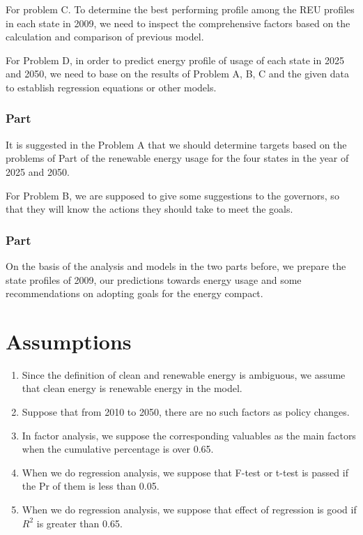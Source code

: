 \documentclass[a4paper,11pt]{article}
\begin{document}
\par For problem C. To determine the best performing profile among the REU profiles in each state in 2009, we need to inspect the comprehensive factors based on the calculation and comparison of previous model.

\par For Problem D, in order to predict energy profile of usage of each state in 2025 and 2050, we need to base on the results of Problem A, B, C and the given data to establish regression equations or other models.

\subsubsection*{Part \uppercase\expandafter{}}

\par It is suggested in the Problem A that we should determine targets based on the problems of Part \uppercase\expandafter{} of the renewable energy usage for the four states in the year of 2025 and 2050. 

\par For Problem B, we are supposed to give some suggestions to the governors, so that they will know the actions they should take to meet the goals.

\subsubsection*{Part \uppercase\expandafter{}}
\par On the basis of the analysis and models in the two parts before, we prepare the state profiles of 2009, our predictions towards energy usage and some recommendations on adopting goals for the energy compact.


\section{Assumptions}
\begin{enumerate}%
\renewcommand{\labelenumi}{(\theenumi)}
    \item Since the definition of clean and renewable energy is ambiguous, we assume that clean energy is renewable energy in the model.
    \item Suppose that from 2010 to 2050, there are no such factors as policy changes.
    \item In factor analysis, we suppose the corresponding valuables as the main factors when the cumulative percentage is over 0.65.
    \item When we do regression analysis, we suppose that F-test or t-test is passed if the Pr of them is less than 0.05.
    \item When we do regression analysis, we suppose that effect of regression is good if $R^{2}$ is greater than 0.65.
\end{enumerate}
\end{document}
